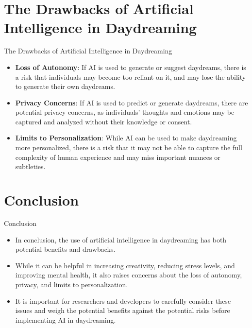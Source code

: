 \documentclass{beamer}
\begin{document}
\section{The Drawbacks of Artificial Intelligence in Daydreaming}

\begin{frame}{The Drawbacks of Artificial Intelligence in Daydreaming}
\begin{itemize}
    \item \textbf{Loss of Autonomy}: If AI is used to generate or suggest daydreams, there is a risk that individuals may become too reliant on it, and may lose the ability to generate their own daydreams.
    \item \textbf{Privacy Concerns}: If AI is used to predict or generate daydreams, there are potential privacy concerns, as individuals' thoughts and emotions may be captured and analyzed without their knowledge or consent.
    \item \textbf{Limits to Personalization}: While AI can be used to make daydreaming more personalized, there is a risk that it may not be able to capture the full complexity of human experience and may miss important nuances or subtleties.
\end{itemize}
\end{frame}

\section{Conclusion}

\begin{frame}{Conclusion}
\begin{itemize}
    \item In conclusion, the use of artificial intelligence in daydreaming has both potential benefits and drawbacks.
    \item While it can be helpful in increasing creativity, reducing stress levels, and improving mental health, it also raises concerns about the loss of autonomy, privacy, and limits to personalization.
    \item It is important for researchers and developers to carefully consider these issues and weigh the potential benefits against the potential risks before implementing AI in daydreaming.
\end{itemize}
\end{frame}
\end{document}
